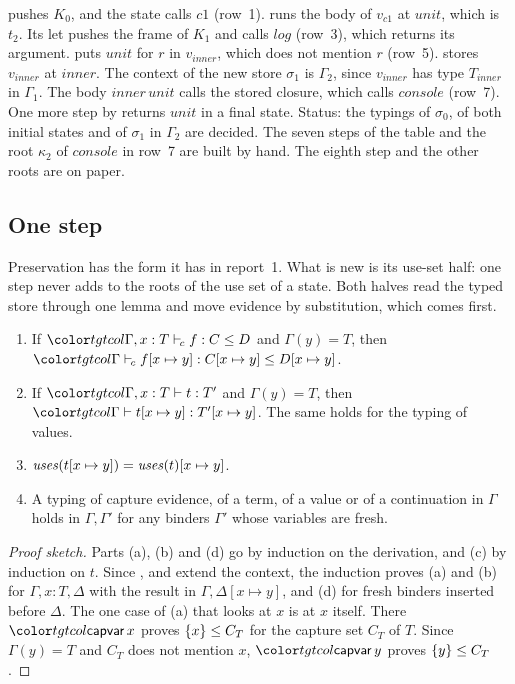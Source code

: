  pushes $K_0$, and the state calls $\mathit{c1}$ (row~1).  runs the body of $v_{\mathit{c1}}$ at $\mathit{unit}$, which is $t_2$. Its let pushes the frame of $K_1$ and calls $\mathit{log}$ (row~3), which returns its argument.  puts $\mathit{unit}$ for $r$ in $v_{\mathit{inner}}$, which does not mention $r$ (row~5).  stores $v_{\mathit{inner}}$ at $\mathit{inner}$. The context of the new store $\sigma_1$ is $\Gamma_2$, since $v_{\mathit{inner}}$ has type $T_{\mathit{inner}}$ in $\Gamma_1$. The body $\mathit{inner}\,\mathit{unit}$ calls the stored closure, which calls $\mathit{console}$ (row~7). One more step by  returns $\mathit{unit}$ in a final state. Status: the typings of $\sigma_0$, of both initial states and of $\sigma_1$ in $\Gamma_2$ are decided. The seven steps of the table and the root $\kappa_2$ of $\mathit{console}$ in row~7 are built by hand. The eighth step and the other roots are on paper.

\FloatBarrier
\subsection{One step}\label{sec:mini-step}

Preservation has the form it has in report~1. What is new is its use-set half: one step never adds to the roots of the use set of a state. Both halves read the typed store through one lemma and move evidence by substitution, which comes first.

\begin{lemma}\label{lem:mini-subst}
\leavevmode
\begin{enumerate}
\item[(a)] If $\clej{\Gamma, x : T}{f}{C}{D}$ and $\Gamma(y) = T$, then $\clej{\Gamma}{f[x \mapsto y]}{C[x \mapsto y]}{D[x \mapsto y]}$.
\item[(b)] If $\tmj{\Gamma, x : T}{t}{T'}$ and $\Gamma(y) = T$, then $\tmj{\Gamma}{t[x \mapsto y]}{T'[x \mapsto y]}$. The same holds for the typing of values.
\item[(c)] $\mathit{uses}(t[x \mapsto y]) = \mathit{uses}(t)[x \mapsto y]$.
\item[(d)] A typing of capture evidence, of a term, of a value or of a continuation in $\Gamma$ holds in $\Gamma, \Gamma'$ for any binders $\Gamma'$ whose variables are fresh.
\end{enumerate}
\end{lemma}

\begin{proof}[Proof sketch]
Parts (a), (b) and (d) go by induction on the derivation, and (c) by induction on $t$. Since ,  and  extend the context, the induction proves (a) and (b) for $\Gamma, x : T, \Delta$ with the result in $\Gamma, \Delta[x \mapsto y]$, and (d) for fresh binders inserted before $\Delta$. The one case of (a) that looks at $x$ is  at $x$ itself. There $\ev{capvar}\,x$ proves $\{x\} \le C_T$ for the capture set $C_T$ of $T$. Since $\Gamma(y) = T$ and $C_T$ does not mention $x$, $\ev{capvar}\,y$ proves $\{y\} \le C_T$.
\end{proof}

